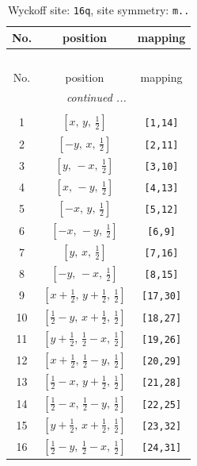 \documentclass[fleqn,8pt]{jsarticle}
\begin{document}
\renewcommand{\arraystretch}{1.2}
\begin{longtable}{ccc}
\caption{Wyckoff site: {\tt 16q}, site symmetry: {\tt m..}}
 \\
 \hline \hline
No. & position & mapping \\ \hline \endfirsthead

\multicolumn{2}{l}{\tablename\ \thetable{}} \\
 \hline \hline
No. & position & mapping \\ \hline \endhead

 \hline \hline
\multicolumn{2}{r}{\footnotesize\it continued ...} \\ \endfoot

 \hline \hline
\multicolumn{2}{r}{} \\ \endlastfoot

1 & $\left[ x,\, y,\, \frac{1}{2} \right]$ & {\tt [1,14]} \\ \hline
2 & $\left[ - y,\, x,\, \frac{1}{2} \right]$ & {\tt [2,11]} \\ \hline
3 & $\left[ y,\, - x,\, \frac{1}{2} \right]$ & {\tt [3,10]} \\ \hline
4 & $\left[ x,\, - y,\, \frac{1}{2} \right]$ & {\tt [4,13]} \\ \hline
5 & $\left[ - x,\, y,\, \frac{1}{2} \right]$ & {\tt [5,12]} \\ \hline
6 & $\left[ - x,\, - y,\, \frac{1}{2} \right]$ & {\tt [6,9]} \\ \hline
7 & $\left[ y,\, x,\, \frac{1}{2} \right]$ & {\tt [7,16]} \\ \hline
8 & $\left[ - y,\, - x,\, \frac{1}{2} \right]$ & {\tt [8,15]} \\ \hline
9 & $\left[ x + \frac{1}{2},\, y + \frac{1}{2},\, \frac{1}{2} \right]$ & {\tt [17,30]} \\ \hline
10 & $\left[ \frac{1}{2} - y,\, x + \frac{1}{2},\, \frac{1}{2} \right]$ & {\tt [18,27]} \\ \hline
11 & $\left[ y + \frac{1}{2},\, \frac{1}{2} - x,\, \frac{1}{2} \right]$ & {\tt [19,26]} \\ \hline
12 & $\left[ x + \frac{1}{2},\, \frac{1}{2} - y,\, \frac{1}{2} \right]$ & {\tt [20,29]} \\ \hline
13 & $\left[ \frac{1}{2} - x,\, y + \frac{1}{2},\, \frac{1}{2} \right]$ & {\tt [21,28]} \\ \hline
14 & $\left[ \frac{1}{2} - x,\, \frac{1}{2} - y,\, \frac{1}{2} \right]$ & {\tt [22,25]} \\ \hline
15 & $\left[ y + \frac{1}{2},\, x + \frac{1}{2},\, \frac{1}{2} \right]$ & {\tt [23,32]} \\ \hline
16 & $\left[ \frac{1}{2} - y,\, \frac{1}{2} - x,\, \frac{1}{2} \right]$ & {\tt [24,31]} \\
\end{longtable}
\end{document}
